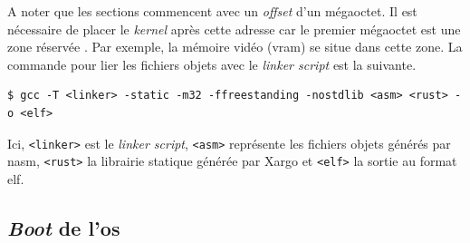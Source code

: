 \begin{center}
    \label{tab:exec:linker_sections}
\end{center}

A noter que les sections commencent avec un \textit{offset} d'un mégaoctet. Il
est nécessaire de placer le \textit{kernel} après cette adresse car le premier
mégaoctet est une zone réservée \cite{ref42,ref13}. Par exemple, la mémoire vidéo
(\acrshort{vram}) se situe dans cette zone. La commande pour lier les fichiers objets
avec le \textit{linker script} est la suivante.

\begin{verbatim}
$ gcc -T <linker> -static -m32 -ffreestanding -nostdlib <asm> <rust> -o <elf>
\end{verbatim}

Ici, \texttt{<linker>} est le \textit{linker script}, \texttt{<asm>}
représente les fichiers objets générés par \acrshort{nasm}, \texttt{<rust>}
la librairie statique générée par Xargo et \texttt{<elf>} la sortie au
format \acrshort{elf}. \\


\subsection{\textit{Boot} de l'\acrshort{os}}
